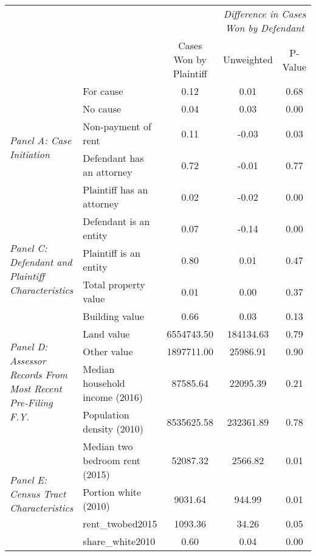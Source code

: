 \begin{tabular}{llccc}
\toprule
 &  & \textit{} & \multicolumn{2}{|c|}{\textit{Difference in Cases Won by Defendant}} \\
 &  & Cases Won by Plaintiff & Unweighted & P-Value \\
\midrule
\multirow[c]{5}{4cm}{\textit{Panel A: Case Initiation}} & For cause & 0.12 & 0.01 & 0.68 \\
 & No cause & 0.04 & 0.03 & 0.00 \\
 & Non-payment of rent & 0.11 & -0.03 & 0.03 \\
 & Defendant has an attorney & 0.72 & -0.01 & 0.77 \\
 & Plaintiff has an attorney & 0.02 & -0.02 & 0.00 \\
\cline{1-5}
\multirow[c]{4}{4cm}{\textit{Panel C: Defendant and Plaintiff Characteristics}} & Defendant is an entity & 0.07 & -0.14 & 0.00 \\
 & Plaintiff is an entity & 0.80 & 0.01 & 0.47 \\
 & Total property value & 0.01 & 0.00 & 0.37 \\
 & Building value & 0.66 & 0.03 & 0.13 \\
\cline{1-5}
\multirow[c]{4}{4cm}{\textit{Panel D: Assessor Records From Most Recent Pre-Filing F.Y.}} & Land value & 6554743.50 & 184134.63 & 0.79 \\
 & Other value & 1897711.00 & 25986.91 & 0.90 \\
 & Median household income (2016) & 87585.64 & 22095.39 & 0.21 \\
 & Population density (2010) & 8535625.58 & 232361.89 & 0.78 \\
\cline{1-5}
\multirow[c]{4}{4cm}{\textit{Panel E: Census Tract Characteristics}} & Median two bedroom rent (2015) & 52087.32 & 2566.82 & 0.01 \\
 & Portion white (2010) & 9031.64 & 944.99 & 0.01 \\
 & rent_twobed2015 & 1093.36 & 34.26 & 0.05 \\
 & share_white2010 & 0.60 & 0.04 & 0.00 \\
\cline{1-5}
\bottomrule
\end{tabular}
